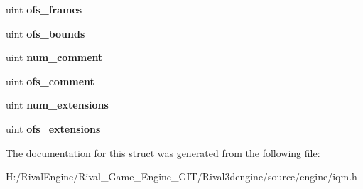 \begin{DoxyCompactItemize}
uint {\bfseries ofs\+\_\+frames}
\item 
\mbox{\label{structiqmheader_a5c76826065bc14d595a94dee17b594f7}} 
uint {\bfseries ofs\+\_\+bounds}
\item 
\mbox{\label{structiqmheader_a32f48fd3f4771b4da5ec0f3cb39561db}} 
uint {\bfseries num\+\_\+comment}
\item 
\mbox{\label{structiqmheader_a0fc0549e5b06f0bdf4c68bda1cc28c50}} 
uint {\bfseries ofs\+\_\+comment}
\item 
\mbox{\label{structiqmheader_a2a5d4a3535d0d5f7ec9d9edcc81e332a}} 
uint {\bfseries num\+\_\+extensions}
\item 
\mbox{\label{structiqmheader_a763b7f801457d81acbfe6f07f78f42bc}} 
uint {\bfseries ofs\+\_\+extensions}
\end{DoxyCompactItemize}


The documentation for this struct was generated from the following file\+:\begin{DoxyCompactItemize}
\item 
H\+:/\+Rival\+Engine/\+Rival\+\_\+\+Game\+\_\+\+Engine\+\_\+\+G\+I\+T/\+Rival3dengine/source/engine/iqm.\+h\end{DoxyCompactItemize}
